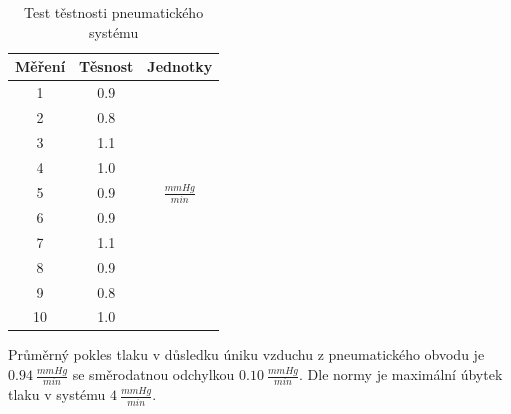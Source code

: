 \begin{table}[H]
    \label{tab:pressure_test_pneu}
    \caption{Test těstnosti pneumatického systému}
    \begin{ctucolortab}
        \begin{tabular}{ccc}
            \toprule
            Měření & Těsnost & Jednotky           \\ \midrule
            1      & 0.9     &                    \\
            2      & 0.8     &                    \\
            3      & 1.1     &                    \\
            4      & 1.0     &                    \\
            5      & 0.9     & $\frac{mmHg}{min}$ \\
            6      & 0.9     &                    \\
            7      & 1.1     &                    \\
            8      & 0.9     &                    \\
            9      & 0.8     &                    \\
            10     & 1.0     &                    \\
            \bottomrule
        \end{tabular}
    \end{ctucolortab}
\end{table}
Průměrný pokles tlaku v důsledku úniku vzduchu z pneumatického obvodu je $0.94 \ \frac{mmHg}{min}$ se směrodatnou odchylkou $0.10  \ \frac{mmHg}{min}$. Dle normy je maximální úbytek tlaku v systému $4 \ \frac{mmHg}{min}$.
